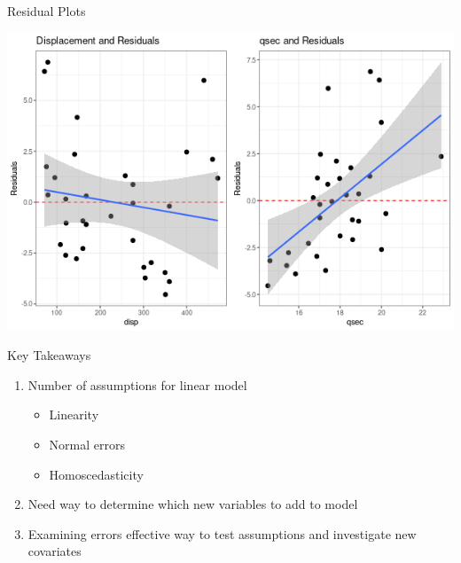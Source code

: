 \documentclass{beamer}
\begin{document}
\begin{frame}{Residual Plots}
\begin{center}
\includegraphics[scale=0.5]{mtcars_resid.png}
\end{center}
\end{frame}



\begin{frame}{Key Takeaways}
\begin{enumerate}
\item Number of assumptions for linear model
\begin{itemize}
\item Linearity 
\item Normal errors
\item Homoscedasticity
\end{itemize}
\item Need way to determine which new variables to add to model
\item Examining errors effective way to test assumptions and investigate new covariates
\end{enumerate}
\end{frame}

%
%
\end{document}
